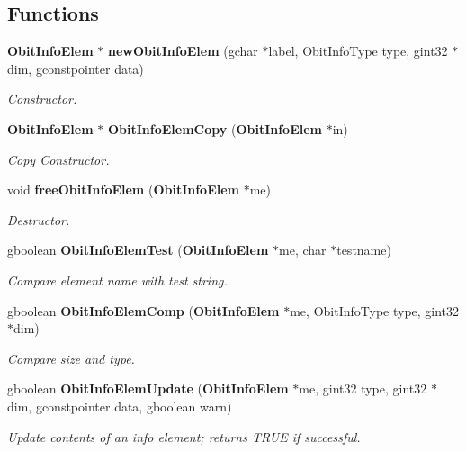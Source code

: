 \subsection*{Functions}
\begin{CompactItemize}
\item 
{\bf Obit\-Info\-Elem} $\ast$ {\bf new\-Obit\-Info\-Elem} (gchar $\ast$label, Obit\-Info\-Type type, gint32 $\ast$dim, gconstpointer data)
\begin{CompactList}\small\item\em Constructor. \item\end{CompactList}\item 
{\bf Obit\-Info\-Elem} $\ast$ {\bf Obit\-Info\-Elem\-Copy} ({\bf Obit\-Info\-Elem} $\ast$in)
\begin{CompactList}\small\item\em Copy Constructor. \item\end{CompactList}\item 
void {\bf free\-Obit\-Info\-Elem} ({\bf Obit\-Info\-Elem} $\ast$me)
\begin{CompactList}\small\item\em Destructor. \item\end{CompactList}\item 
gboolean {\bf Obit\-Info\-Elem\-Test} ({\bf Obit\-Info\-Elem} $\ast$me, char $\ast$testname)
\begin{CompactList}\small\item\em Compare element name with test string. \item\end{CompactList}\item 
gboolean {\bf Obit\-Info\-Elem\-Comp} ({\bf Obit\-Info\-Elem} $\ast$me, Obit\-Info\-Type type, gint32 $\ast$dim)
\begin{CompactList}\small\item\em Compare size and type. \item\end{CompactList}\item 
gboolean {\bf Obit\-Info\-Elem\-Update} ({\bf Obit\-Info\-Elem} $\ast$me, gint32 type, gint32 $\ast$dim, gconstpointer data, gboolean warn)
\begin{CompactList}\small\item\em Update contents of an info element; returns TRUE if successful. \item\end{CompactList}\item 

\end{CompactItemize}
